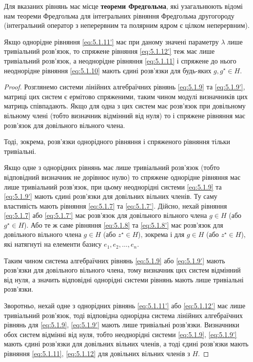 Для вказаних рівнянь має місце \textbf{теореми Фредгольма}, які узагальнюють відомі нам теореми Фредгольма для інтегральних рівняння Фредгольма другогороду (інтегральний оператор з неперервним та полярним ядром є цілком неперервним). 

\begin{theorem}
    Якщо однорідне рівняння \eqref{eq:5.1.11'} має при даному значені параметру $\lambda$ лише тривіальний розв'язок, то спряжене рівняння \eqref{eq:5.1.12'} теж має лише тривіальний розв'язок, а неоднорідне рівняння \eqref{eq:5.1.11} і спряжене до нього неоднорідне рівняння \eqref{eq:5.1.10} мають єдині розв'язки для будь-яких $g, g^\star \in H$.
\end{theorem}

\begin{proof}
    Розглянемо системи лінійних алгебраїчних рівнянь \eqref{eq:5.1.9} та \eqref{eq:5.1.9'}, матриці цих систем є ермітово спряженими, таким чином модулі визначників цих матриць співпадають. Якщо для одна з цих систем має розв'язок при довільному вільному члені (тобто визначник відмінний від нуля) то і спряжене рівняння має розв'язок для довільного вільного члена. \medskip

    Тоді, зокрема, розв'язки однорідного рівняння і спряженого рівняння тільки тривіальні. \medskip

    Якщо одне з однорідних рівнянь має лише тривіальний розв'язок (тобто відповідний визначник не дорівнює нулю) то спряжене однорідне рівняння має лише тривіальний розв'язок, при цьому неоднорідні системи \eqref{eq:5.1.9} та \eqref{eq:5.1.9'} мають єдині розв'язки для довільних вільних членів. Ту саму властивість мають рівняння \eqref{eq:5.1.7} та \eqref{eq:5.1.7'}. Дійсно, нехай рівняння \eqref{eq:5.1.7} або \eqref{eq:5.1.7'} має розв'язок для довільного вільного члена $g \in H$ (або $g^\star \in H$). Або те ж саме рівняння \eqref{eq:5.1.8} та \eqref{eq:5.1.8'} має розв'язок для довільного вільного члена $g \in H$ (або $z^\star \in H$), зокрема і для $g \in H$ (або $z^\star \in H$), які натягнуті на елементи базису $e_1, e_2, \ldots, e_n$. \medskip

    Таким чином система алгебраїчних рівнянь \eqref{eq:5.1.9} або \eqref{eq:5.1.9'} мають розв'язки для довільного вільного члена, тому визначник цих систем відмінний від нуля, а значить відповідні однорідні системи рівнянь мають лише тривіальні розв'язки. \medskip

    Зворотньо, нехай одне з однорідних рівнянь \eqref{eq:5.1.11'} або \eqref{eq:5.1.12'} має лише тривіальний розв’язок, тоді відповідна однорідна система лінійних алгебраїчних рівнянь для \eqref{eq:5.1.9}, \eqref{eq:5.1.9'} мають лише тривіальні розв'язки. Визначники обох систем відмінні від нуля, тобто неоднорідні системи \eqref{eq:5.1.9}, \eqref{eq:5.1.9'} мають єдині розв'язки для довільних вільних членів, а тоді єдині розв'язки мають рівняння \eqref{eq:5.1.11}, \eqref{eq:5.1.12} для довільних вільних членів з $H$.
\end{proof}

